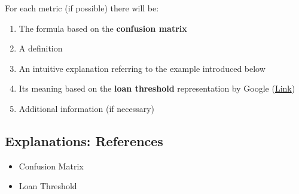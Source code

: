 \documentclass[12pt,a4paper]{article}
\begin{document}
For each metric (if possible) there will be:
\begin{enumerate}
\item The formula based on the \textbf{confusion matrix}
\item A definition
\item An intuitive explanation referring to the example introduced below
\item Its meaning based on the \textbf{loan threshold} representation by Google (\href{https://research.google.com/bigpicture/attacking-discrimination-in-ml/}{Link})
\item Additional information (if necessary)
\end{enumerate}
\subsection*{Explanations: References}
\begin{itemize}
\item Confusion Matrix 
\item Loan Threshold
\end{itemize}
%
\end{document}

